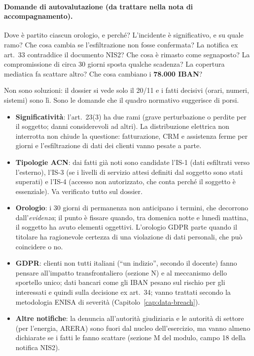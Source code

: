 \paragraph{Domande di autovalutazione (da trattare nella nota di accompagnamento).} Dove è partito
ciascun orologio, e perché? L'incidente è significativo, e su quale ramo? Che cosa cambia se
l'esfiltrazione non fosse confermata? La notifica ex art.~33 contraddice il documento NIS2? Che cosa è
rimasto come segnaposto? La compromissione di circa 30 giorni sposta qualche scadenza? La copertura
mediatica fa scattare altro? Che cosa cambiano i \textbf{78.000 IBAN}?

\begin{integrazione}
Non sono soluzioni: il dossier si vede solo il 20/11 e i fatti decisivi (orari, numeri, sistemi) sono
lì. Sono le domande che il quadro normativo suggerisce di porsi.
\begin{itemize}
  \item \textbf{Significatività}: l'art.~23(3) ha due rami (grave perturbazione o perdite per il
    soggetto; danni considerevoli ad altri). La distribuzione elettrica non interrotta non chiude la
    questione: fatturazione, CRM e assistenza ferme per giorni e l'esfiltrazione di dati dei clienti
    vanno pesate a parte.
  \item \textbf{Tipologie ACN}: dai fatti già noti sono candidate l'IS-1 (dati esfiltrati verso
    l'esterno), l'IS-3 (se i livelli di servizio attesi definiti dal soggetto sono stati superati) e
    l'IS-4 (accesso non autorizzato, che conta perché il soggetto è essenziale). Va verificato tutto sul
    dossier.
  \item \textbf{Orologio}: i 30 giorni di permanenza non anticipano i termini, che decorrono
    dall'\emph{evidenza}; il punto è fissare quando, tra domenica notte e lunedì mattina, il soggetto ha
    avuto elementi oggettivi. L'orologio GDPR parte quando il titolare ha ragionevole certezza di una
    violazione di dati personali, che può coincidere o no.
  \item \textbf{GDPR}: clienti non tutti italiani (``un indizio'', secondo il docente) fanno pensare
    all'impatto transfrontaliero (sezione N) e al meccanismo dello sportello unico; dati bancari come gli
    IBAN pesano sul rischio per gli interessati e quindi sulla decisione ex art.~34; vanno trattati
    secondo la metodologia ENISA di severità (Capitolo~\ref{cap:data-breach}).
  \item \textbf{Altre notifiche}: la denuncia all'autorità giudiziaria e le autorità di settore (per
    l'energia, ARERA) sono fuori dal nucleo dell'esercizio, ma vanno almeno dichiarate se i fatti le
    fanno scattare (sezione M del modulo, campo 18 della notifica NIS2).
\end{itemize}
\end{integrazione}

